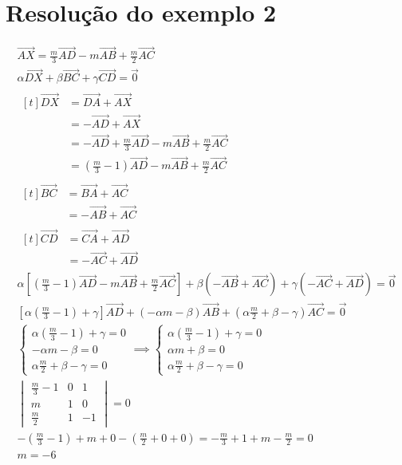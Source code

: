 \documentclass[brazilian, fleqn]{article}
\renewcommand{\vec}[1]{\overrightarrow{#1}}
\begin{document}
\section{Resolução do exemplo 2}

\begin{gather}
    \vec{AX} = \frac{m}{3}\vec{AD} - m \vec{AB} +\frac{m}{2} \vec{AC} \\
    \alpha \vec{DX} +\beta \vec{BC} + \gamma \vec{CD} = \vec{0} \\
    \begin{aligned}[t]
        \vec{DX} &=\vec{DA}+\vec{AX} \\
                 &=-\vec{AD}+\vec{AX}\\
                 &=-\vec{AD}+\frac{m}{3}\vec{AD} - m \vec{AB} +\frac{m}{2} \vec{AC} \\
                 &= \left(\frac{m}{3}-1\right)\vec{AD}- m \vec{AB} +\frac{m}{2} \vec{AC} 
    \end{aligned} \\
    \begin{aligned}[t]
        \vec{BC}&=\vec{BA}+\vec{AC}\\
                &= -\vec{AB}+\vec{AC} 
    \end{aligned} \\
    \begin{aligned}[t]
        \vec{CD}&=\vec{CA}+\vec{AD}\\
                &= -\vec{AC}+\vec{AD} 
    \end{aligned} \\
    \alpha \left[ \left(\frac{m}{3}-1\right)\vec{AD}- m \vec{AB} +\frac{m}{2} \vec{AC} \right]
    +\beta \left( -\vec{AB}+\vec{AC} \right)+\gamma\left( -\vec{AC}+\vec{AD} \right)=\vec{0} \\
    \left[\alpha \left(\frac{m}{3}-1\right) +\gamma\right] \vec{AD}+\left(-\alpha m-\beta\right)\vec{AB}+
    \left(\alpha\frac{m}{2} +\beta-\gamma\right)\vec{AC}=\vec{0}\\
    \begin{cases}
        \alpha \left(\frac{m}{3}-1\right) +\gamma = 0 \\
        -\alpha m-\beta=0 \\
        \alpha\frac{m}{2} +\beta-\gamma = 0
    \end{cases}
    \implies
    \begin{cases}
        \alpha \left(\frac{m}{3}-1\right) +\gamma = 0 \\
        \alpha m+\beta=0 \\
        \alpha\frac{m}{2} +\beta-\gamma = 0
    \end{cases} \\
    \begin{vmatrix}
        \frac{m}{3}-1 & 0 & 1 \\
        m & 1  & 0 \\
        \frac{m}{2} & 1 & -1
    \end{vmatrix} =0 \\
    -\left(\frac{m}{3}-1\right)+m+0-\left(\frac{m}{2}+0+0\right)=-\frac{m}{3}+1+m-\frac{m}{2}=0 \\
    m = -6
\end{gather}
\end{document}
